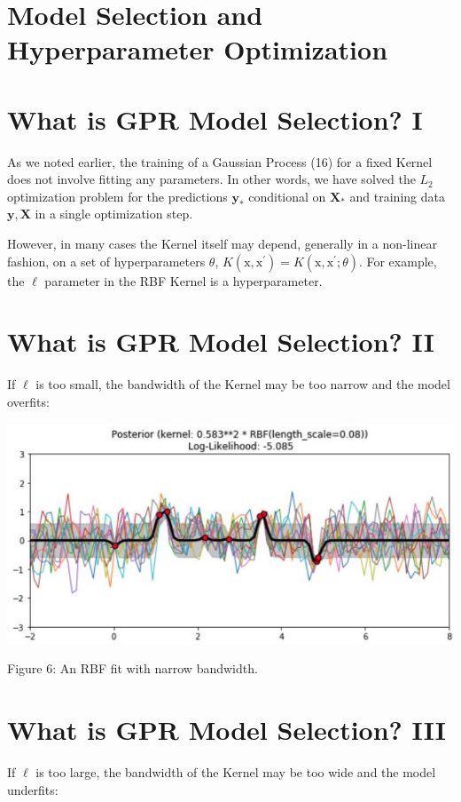 \documentclass[11pt]{article}
\theoremstyle{plain} %
\theoremstyle{remark}
\begin{document}
\section{Model Selection and Hyperparameter Optimization}

\section*{What is GPR Model Selection? I}
As we noted earlier, the training of a Gaussian Process (16) for a fixed Kernel
does not involve fitting any parameters. In other words, we have solved the
$L_{2}$ optimization problem for the predictions $\mathbf{y}_{*}$ conditional on
$\mathbf{X}_{*}$ and training data $\mathbf{y}, \mathbf{X}$ in a single
optimization step.

However, in many cases the Kernel itself may depend, generally in a non-linear
fashion, on a set of hyperparameters $\theta$, $K\left(\mathrm{x},
\mathrm{x}^{\prime}\right)=K\left(\mathrm{x}, \mathrm{x}^{\prime} ;
\theta\right)$. For example, the $\ell$ parameter in the RBF Kernel is a
hyperparameter.

\section*{What is GPR Model Selection? II}
If $\ell$ is too small, the bandwidth of the Kernel may be too narrow and the
model overfits:

\begin{center}
\includegraphics[width=\textwidth]{images/2023_11_26_5b299dbd302e8f129737g-60}
\end{center}

Figure 6: An RBF fit with narrow bandwidth.

\section*{What is GPR Model Selection? III}
If $\ell$ is too large, the bandwidth of the Kernel may be too wide and the
model underfits:
\end{document}
